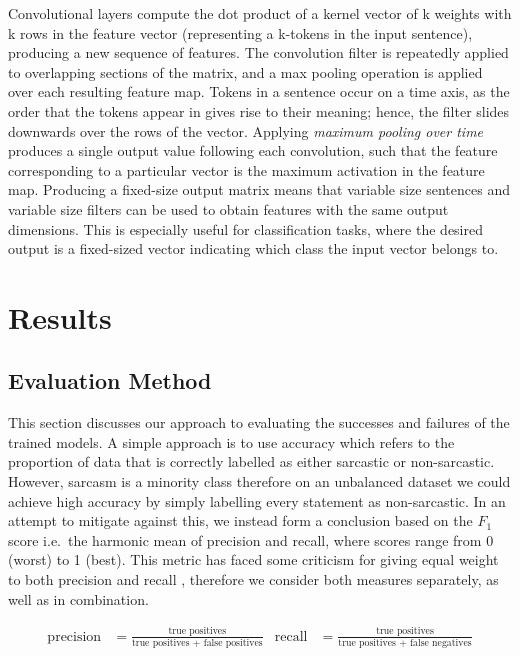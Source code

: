 \documentclass[12pt,a4paper]{article}
\begin{document}
Convolutional layers compute the dot product of a kernel vector of k weights with k rows in the feature vector (representing a k-tokens in the input sentence), producing a new sequence of features. The convolution filter is repeatedly applied to overlapping sections of the matrix, and a max pooling operation is applied over each resulting feature map. Tokens in a sentence occur on a time axis, as the order that the tokens appear in gives rise to their meaning; hence, the filter slides downwards over the rows of the vector. Applying \textit{maximum pooling over time} produces a single output value following each convolution, such that the feature corresponding to a particular vector is the maximum activation in the feature map. Producing a fixed-size output matrix means that variable size sentences and variable size filters can be used to obtain features with the same output dimensions. This is especially useful for classification tasks, where the desired output is a fixed-sized vector indicating which class the input vector belongs to.



\section{Results}
\subsection{Evaluation Method}
\noindent This section discusses our approach to evaluating the successes and failures of the trained models. A simple approach is to use accuracy which refers to the proportion of data that is correctly labelled as either sarcastic or non-sarcastic. However, sarcasm is a minority class therefore on an unbalanced dataset we could achieve high accuracy by simply labelling every statement as non-sarcastic. In an attempt to mitigate against this, we instead form a conclusion based on the $F_{1}$ score i.e.\ the harmonic mean of precision and recall, where scores range from 0 (worst) to 1 (best). This metric has faced some criticism for giving equal weight to both precision and recall \cite{hand2018note}, therefore we consider both measures separately, as well as in combination.

\begin{align*}
\mbox{precision} &= \frac{\mbox{true positives}}{\mbox{true positives + false positives}}   &  \mbox{recall} &= \frac{\mbox{true positives}}{\mbox{true positives + false negatives}}
\end{align*}
\end{document}
